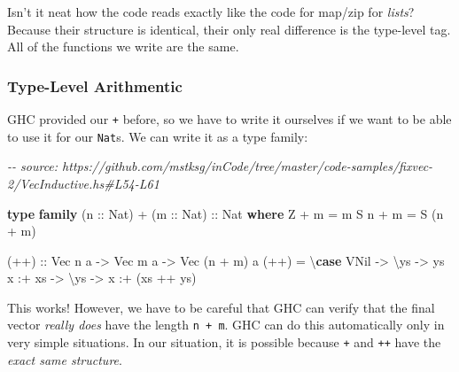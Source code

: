 \documentclass[]{article}
\newenvironment{Shaded}{}{}
\newcommand{\CommentTok}[1]{\textcolor[rgb]{0.38,0.63,0.69}{\textit{#1}}}
\newcommand{\DataTypeTok}[1]{\textcolor[rgb]{0.56,0.13,0.00}{#1}}
\newcommand{\KeywordTok}[1]{\textcolor[rgb]{0.00,0.44,0.13}{\textbf{#1}}}
\newcommand{\NormalTok}[1]{#1}
\newcommand{\OperatorTok}[1]{\textcolor[rgb]{0.40,0.40,0.40}{#1}}
\newcommand{\OtherTok}[1]{\textcolor[rgb]{0.00,0.44,0.13}{#1}}
\begin{document}
Isn't it neat how the code reads exactly like the code for map/zip for
\emph{lists}? Because their structure is identical, their only real difference
is the type-level tag. All of the functions we write are the same.

\hypertarget{type-level-arithmentic}{%
\subsubsection{Type-Level Arithmentic}\label{type-level-arithmentic}}

GHC provided our \texttt{+} before, so we have to write it ourselves if we want
to be able to use it for our \texttt{Nat}s. We can write it as a type family:

\begin{Shaded}
\begin{Highlighting}[]
\CommentTok{{-}{-} source: https://github.com/mstksg/inCode/tree/master/code{-}samples/fixvec{-}2/VecInductive.hs\#L54{-}L61}

\KeywordTok{type} \KeywordTok{family}\NormalTok{ (}\OtherTok{n ::} \DataTypeTok{Nat}\NormalTok{) }\OperatorTok{+}\NormalTok{ (}\OtherTok{m ::} \DataTypeTok{Nat}\NormalTok{)}\OtherTok{ ::} \DataTypeTok{Nat} \KeywordTok{where}
    \DataTypeTok{\textquotesingle{}Z}   \OperatorTok{+}\NormalTok{ m }\OtherTok{=}\NormalTok{ m}
    \DataTypeTok{\textquotesingle{}S}\NormalTok{ n }\OperatorTok{+}\NormalTok{ m }\OtherTok{=} \DataTypeTok{\textquotesingle{}S}\NormalTok{ (n }\OperatorTok{+}\NormalTok{ m)}

\OtherTok{(++) ::} \DataTypeTok{Vec}\NormalTok{ n a }\OtherTok{{-}>} \DataTypeTok{Vec}\NormalTok{ m a }\OtherTok{{-}>} \DataTypeTok{Vec}\NormalTok{ (n }\OperatorTok{+}\NormalTok{ m) a}
\NormalTok{(}\OperatorTok{++}\NormalTok{) }\OtherTok{=}\NormalTok{ \textbackslash{}}\KeywordTok{case}
    \DataTypeTok{VNil}    \OtherTok{{-}>}\NormalTok{ \textbackslash{}ys }\OtherTok{{-}>}\NormalTok{ ys}
\NormalTok{    x }\OperatorTok{:+}\NormalTok{ xs }\OtherTok{{-}>}\NormalTok{ \textbackslash{}ys }\OtherTok{{-}>}\NormalTok{ x }\OperatorTok{:+}\NormalTok{ (xs }\OperatorTok{++}\NormalTok{ ys)}
\end{Highlighting}
\end{Shaded}

This works! However, we have to be careful that GHC can verify that the final
vector \emph{really does} have the length \texttt{n\ +\ m}. GHC can do this
automatically only in very simple situations. In our situation, it is possible
because \texttt{+} and \texttt{++} have the \emph{exact same structure}.
\end{document}
